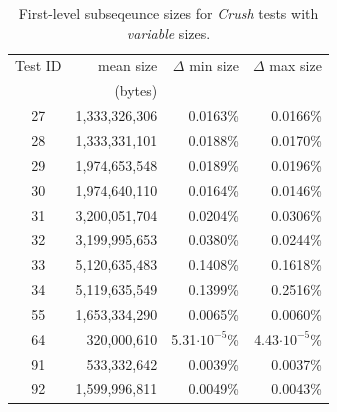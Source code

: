 \documentclass[
  digital,     %
  oneside,     %
  nosansbold,  %
  nocolorbold, %
  nolof,         %
  nolot,         %
]{fithesis4}
\begin{document}
\begin{table}[H]
  \begin{tabularx}{0.75\textwidth}{c|r|r|r}
   Test ID & mean size & $\Delta$ min size & $\Delta$ max size\\
     & (bytes) & & \\
    \midrule
    27&1,333,326,306&0.0163\%&0.0166\%\\
    28&1,333,331,101&0.0188\%&0.0170\%\\	
    29&1,974,653,548&0.0189\%&0.0196\%	\\
    30&1,974,640,110&0.0164\%&0.0146\%	\\
    31&3,200,051,704&0.0204\%&0.0306\%	\\
    32&3,199,995,653&0.0380\%&0.0244\%	\\
    33&5,120,635,483&0.1408\%&0.1618\%	\\
    34&5,119,635,549&0.1399\%&0.2516\%	\\
    55&1,653,334,290&0.0065\%&0.0060\%	\\
    64&320,000,610&5.31$\cdot10^{-5}$\% &4.43$\cdot10^{-5}$\%\\
    91&533,332,642&0.0039\%&0.0037\%	\\
    92&1,599,996,811&0.0049\%&0.0043\%\\

  \end{tabularx}
  \caption{First-level subseqeunce sizes for \emph{Crush} tests with \emph{variable} sizes.}
  \label{tab:analysis_crush_variable}
\end{table}
\end{document}
